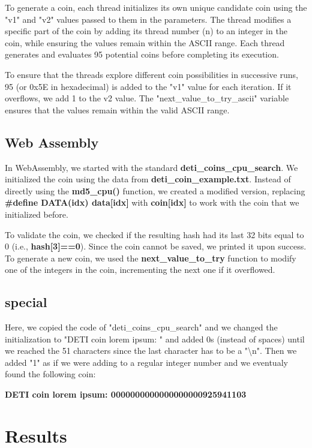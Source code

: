 \documentclass[a4paper,12pt]{article}
\begin{document}
To generate a coin, each thread initializes its own unique candidate coin using the "v1" and "v2" values passed to them in the parameters. The thread modifies a specific part of the coin by adding its thread number (n) to an integer in the coin, while ensuring the values remain within the ASCII range. Each thread generates and evaluates 95 potential coins before completing its execution.

To ensure that the threads explore different coin possibilities in successive runs, 95 (or 0x5E in hexadecimal) is added to the "v1" value for each iteration. If it overflows, we add 1 to the v2 value. The "next\_value\_to\_try\_ascii" variable ensures that the values remain within the valid ASCII range.

\subsection{Web Assembly}
\label{subsec:wasm}

In WebAssembly, we started with the standard \textbf{deti\_coins\_cpu\_search}. We initialized the coin using the data from \textbf{deti\_coin\_example.txt}. Instead of directly using the \textbf{md5\_cpu()} function, we created a modified version, replacing \textbf{\#define DATA(idx) data[idx]} with \textbf{coin[idx]} to work with the coin that we initialized before.

To validate the coin, we checked if the resulting hash had its last 32 bits equal to 0 (i.e., \textbf{hash[3]==0}). Since the coin cannot be saved, we printed it upon success. To generate a new coin, we used the \textbf{next\_value\_to\_try} function to modify one of the integers in the coin, incrementing the next one if it overflowed.

\subsection{special}
\label{subsec:special}

Here, we copied the code of "deti\_coins\_cpu\_search" and we changed the initialization to "DETI coin lorem ipsum: " and added 0s (instead of spaces) until we reached the 51 characters since the last character has to be a "\textbackslash n". Then we added "1" as if we were adding to a regular integer number and we eventualy found the following coin:

\textbf{DETI coin lorem ipsum: 0000000000000000000925941103}

\section{Results}
\label{sec:results}
\end{document}
